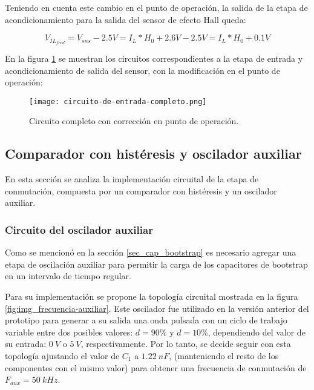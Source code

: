 Teniendo en cuenta este cambio en el punto de operación, la salida de la etapa de acondicionamiento para la salida del sensor de efecto Hall queda:

\begin{equation} \label{eq_salida_restador_hall_2}
	V_{IL_{feed}}=V_{sns}-2.5V =I_L*H_0 + 2.6V - 2.5V =I_L*H_0+0.1V
\end{equation}

En la figura \ref{fig:img_circuito-de-entrada-completo.png} se muestran los circuitos correspondientes a la etapa de entrada y acondicionamiento de salida del sensor, con la modificación en el punto de operación:

\begin{figure}[H]
	\centering
	\texttt{[image: circuito-de-entrada-completo.png]}
	\caption{Circuito completo con corrección en punto de operación.}
	\label{fig:img_circuito-de-entrada-completo.png}
\end{figure}


\subsection{Comparador con histéresis y oscilador auxiliar}

En esta sección se analiza la implementación circuital de la etapa de conmutación, compuesta por un comparador con histéresis y un oscilador auxiliar.

\subsubsection{Circuito del oscilador auxiliar}

Como se mencionó en la sección \ref{sec_cap_bootstrap} es necesario agregar una etapa de oscilación auxiliar para permitir la carga de los capacitores de bootstrap en un intervalo de tiempo regular.

Para su implementación se propone la topología circuital mostrada en la figura \ref{fig:img_frecuencia-auxiliar}. Este oscilador fue utilizado en la versión anterior del prototipo para generar a su salida una onda pulsada con un ciclo de trabajo variable entre dos posibles valores: $d=90\%$ y $d=10\%$, dependiendo del valor de su entrada: $0\:V$ o $5\:V$, respectivamente. Por lo tanto, se decide seguir con esta topología ajustando el valor de $C_1$ a $1.22\:nF$, (manteniendo el resto de los componentes con el mismo valor) para obtener una frecuencia de conmutación de $F_{aux}=50\:kHz$.

